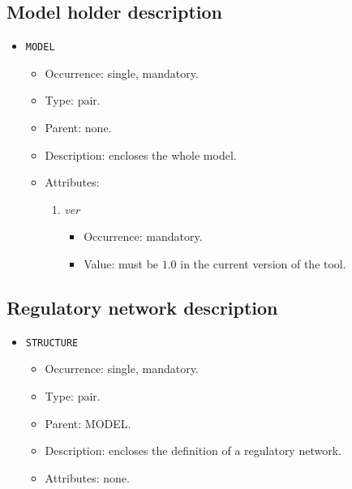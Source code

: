 \documentclass[12pt]{article}
\newenvironment{menum}{
\begin{enumerate}
  \setlength{\itemsep}{0pt}
  \setlength{\parskip}{0pt}
  \setlength{\parsep}{0pt}
}{\end{enumerate}}
\newenvironment{mitem}{
\begin{itemize}
  \setlength{\itemsep}{0pt}
  \setlength{\parskip}{0pt}
  \setlength{\parsep}{0pt}
}{\end{itemize}}
\begin{document}
\subsection{Model holder description}
\begin{mitem}
	\item \texttt{MODEL}
	\begin{mitem}
		\item Occurrence: single, mandatory.
		\item Type: pair.
		\item Parent: none.
		\item Description: encloses the whole model.
		\item Attributes:	
		\begin{menum}
			\item \textit{ver} 
			\begin{mitem}
				\item Occurrence: mandatory.
				\item Value: must be $1.0$ in the current version of the tool.
			\end{mitem}
		\end{menum}
	\end{mitem}
\end{mitem}

\subsection{Regulatory network description}
\begin{mitem}
	\item \texttt{STRUCTURE}
	\begin{mitem}
		\item Occurrence: single, mandatory.
		\item Type: pair.
		\item Parent: MODEL.
		\item Description: encloses the definition of a regulatory network.
		\item Attributes: none.
	\end{mitem}
\end{mitem}
	
\end{document}
